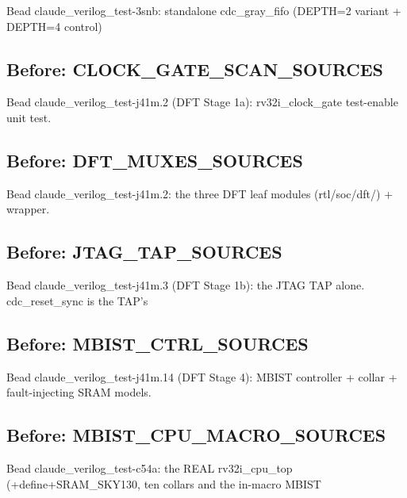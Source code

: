 \begin{record}
\begin{textblock}
Bead claude_verilog_test-3snb: standalone cdc_gray_fifo (DEPTH=2 variant + DEPTH=4 control)
\end{textblock}

\subsection*{Before: CLOCK\_GATE\_SCAN\_SOURCES}

\begin{textblock}
Bead claude_verilog_test-j41m.2 (DFT Stage 1a): rv32i_clock_gate test-enable unit test.
\end{textblock}

\subsection*{Before: DFT\_MUXES\_SOURCES}

\begin{textblock}
Bead claude_verilog_test-j41m.2: the three DFT leaf modules (rtl/soc/dft/) + wrapper.
\end{textblock}

\subsection*{Before: JTAG\_TAP\_SOURCES}

\begin{textblock}
Bead claude_verilog_test-j41m.3 (DFT Stage 1b): the JTAG TAP alone. cdc_reset_sync is the TAP's
\end{textblock}

\subsection*{Before: MBIST\_CTRL\_SOURCES}

\begin{textblock}
Bead claude_verilog_test-j41m.14 (DFT Stage 4): MBIST controller + collar + fault-injecting SRAM models.
\end{textblock}

\subsection*{Before: MBIST\_CPU\_MACRO\_SOURCES}

\begin{textblock}
Bead claude_verilog_test-c54a: the REAL rv32i_cpu_top (+define+SRAM_SKY130, ten collars and the in-macro MBIST
\end{textblock}


\end{record}
